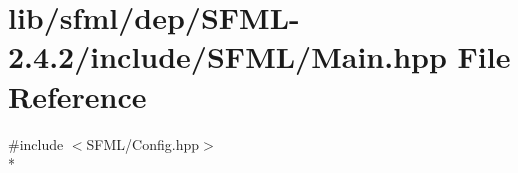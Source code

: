 \hypertarget{sfml_2dep_2_s_f_m_l-2_84_82_2include_2_s_f_m_l_2_main_8hpp}{\section{lib/sfml/dep/\-S\-F\-M\-L-\/2.4.2/include/\-S\-F\-M\-L/\-Main.hpp File Reference}
\label{sfml_2dep_2_s_f_m_l-2_84_82_2include_2_s_f_m_l_2_main_8hpp}
}
{\ttfamily \#include $<$S\-F\-M\-L/\-Config.\-hpp$>$}\\*
